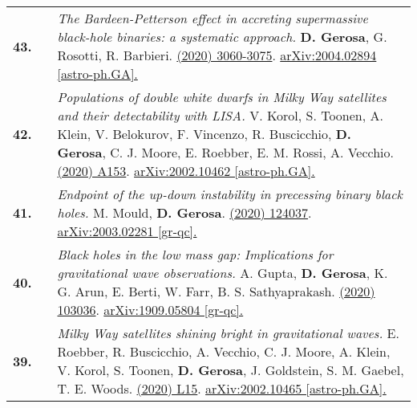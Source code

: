 {\begin{longtable}{rp{0.3cm}p{15.8cm}}
%
\textbf{43.} & & \textit{The Bardeen-Petterson effect in accreting supermassive black-hole binaries: a systematic approach.}
\newline{}
\textbf{D. Gerosa}, G. Rosotti, R. Barbieri.
\newline{}
\href{https://doi.org/10.1093/mnras/staa1693}{\mnras 496 (2020) 3060-3075}. \href{https://arxiv.org/abs/2004.02894}{arXiv:2004.02894 [astro-ph.GA].}
\vspace{0.09cm}\\
%
\textbf{42.} & & \textit{Populations of double white dwarfs in Milky Way satellites and their detectability with LISA.}
\newline{}
V. Korol, S. Toonen, A. Klein, V. Belokurov, F. Vincenzo, R. Buscicchio, \textbf{D. Gerosa}, C. J. Moore, E. Roebber, E. M. Rossi, A. Vecchio.
\newline{}
\href{https://www.aanda.org/articles/aa/abs/2020/06/aa37764-20/aa37764-20.html}{\aap 638 (2020) A153}. \href{https://arxiv.org/abs/2002.10462}{arXiv:2002.10462 [astro-ph.GA].}
\vspace{0.09cm}\\
%
\textbf{41.} & & \textit{Endpoint of the up-down instability in precessing binary black holes.}
\newline{}
M. Mould, \textbf{D. Gerosa}.
\newline{}
\href{https://journals.aps.org/prd/abstract/10.1103/PhysRevD.101.124037}{\prd 101 (2020) 124037}. \href{https://arxiv.org/abs/2003.02281}{arXiv:2003.02281 [gr-qc].}
\vspace{0.09cm}\\
%
\textbf{40.} & & \textit{Black holes in the low mass gap: Implications for gravitational wave observations.}
\newline{}
A. Gupta, \textbf{D. Gerosa}, K. G. Arun, E. Berti, W. Farr, B. S. Sathyaprakash.
\newline{}
\href{https://journals.aps.org/prd/abstract/10.1103/PhysRevD.101.103036}{\prd 101 (2020) 103036}. \href{https://arxiv.org/abs/1909.05804}{arXiv:1909.05804 [gr-qc].}
\vspace{0.09cm}\\
%
\textbf{39.} & & \textit{Milky Way satellites shining bright in gravitational waves.}
\newline{}
E. Roebber, R. Buscicchio, A. Vecchio, C. J. Moore, A. Klein, V. Korol, S. Toonen, \textbf{D. Gerosa}, J. Goldstein, S. M. Gaebel, T. E. Woods.
\newline{}
\href{https://iopscience.iop.org/article/10.3847/2041-8213/ab8ac9}{\apjl 894 (2020) L15}. \href{https://arxiv.org/abs/2002.10465}{arXiv:2002.10465 [astro-ph.GA].}

\end{longtable}}
